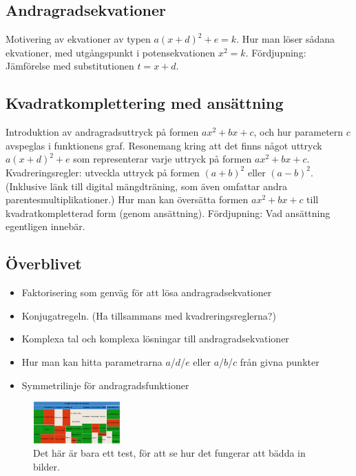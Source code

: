 \documentclass[12pt]{article}
\begin{document}
  \subsection{Andragradsekvationer}
  Motivering av ekvationer av typen $a(x+d)^2+e=k$.
  Hur man löser sådana ekvationer, med utgångspunkt i potensekvationen $x^2 = k$.
  Fördjupning: Jämförelse med substitutionen $t=x+d$.

  \subsection{Kvadratkomplettering med ansättning}
  Introduktion av andragradsuttryck på formen $ax^2+bx+c$, och hur parametern $c$ avspeglas i funktionens graf.
  Resonemang kring att det finns något uttryck $a(x+d)^2+e$ som representerar varje uttryck på formen $ax^2+bx+c$.
  Kvadreringsregler: utveckla uttryck på formen $(a+b)^2$ eller $(a-b)^2$.
  (Inklusive länk till digital mängdträning, som även omfattar andra parentesmultiplikationer.)
  Hur man kan översätta formen $ax^2+bx+c$ till kvadratkompletterad form (genom ansättning).
  Fördjupning: Vad ansättning egentligen innebär.
  
  \subsection{Överblivet}
  \begin{itemize}
    \item Faktorisering som genväg för att lösa andragradsekvationer
    \item Konjugatregeln. (Ha tillsammans med kvadreringsreglerna?)
    \item Komplexa tal och komplexa lösningar till andragradsekvationer
    \item Hur man kan hitta parametrarna $a$/$d$/$e$ eller $a$/$b$/$c$ från givna punkter
    \item Symmetrilinje för andragradsfunktioner
  \end{itemize}
  
  \begin{figure}
  \centering
  \includegraphics[width=0.3\textwidth]{bilder/testbild.png}
  \caption{\label{fig:testbild}Det här är bara ett test, för att se hur det fungerar att bädda in bilder.}
  \end{figure}
\end{document}
